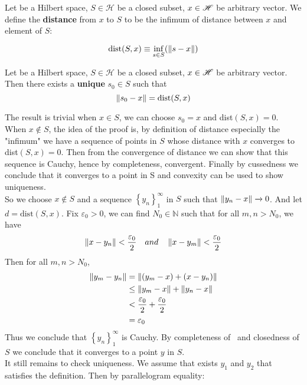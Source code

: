 \begin{definition}\rm\nextline
	Let \hbs be a Hilbert space, $S\in \mathscr{H}$ be a closed subset, $x\in \mathscr{H}$ be arbitrary vector. We define the {\bf{distance}} from $x$ to $S$ to be the infimum of distance between $x$ and element of $S$:

	$$\text{dist}(S,x)\equiv\inf_{s\in S} (\left\|{s-x}\right\|)$$

\end{definition}
\begin{proposition}\rm\label{Nearest Point Property}\nextline
	Let \hbs be a Hilbert space, $S\in \mathscr{H}$ be a closed subset, $x\in \mathscr{H}$ be arbitrary vector. Then there exists a {\bf{unique}} $s_0\in S$ such that
	$$
		\left\|{s_0-x}\right\|= \text{dist}(S,x)
	$$
	\begin{pf}{}{}
	The result is trivial when $x\in S$, we can choose $s_0=x$ and dist$(S,x)=0$.\\
	When $x\notin S$, the idea of the proof is, by definition of distance especially the "infimum" we have a sequence of points in $S$ whose distance with $x$ converges to dist$(S,x)=0$. Then from the convergence of distance we can show that this sequence is Cauchy, hence by completeness, convergent. Finally by cussedness we conclude that it converges to a point in S and convexity can be used to show uniqueness. \\
	So we choose $x\notin S$ and a sequence $\left\{y_n\right\}_1^\infty$ in $S$ such that $\left\|{y_n-x}\right\|\xrightarrow{}0$. And let $d=\text{dist}(S,x)$.
	Fix $\varepsilon_0>0$, we can find $N_0\in\mathbb{N}$ such that for all $m,n>N_0$, we have $$\left\|{x-y_n}\right\|<\frac{\varepsilon_0}{2}\quad and\quad \left\|{x-y_m}\right\|<\frac{\varepsilon_0}{2}
	$$
	Then for all $m,n>N_0$,
	\begin{equation}
		\begin{split}
			\left\|{y_m-y_n}\right\|&=\left\|{(y_m-x)+(x-y_n)}\right\|\\
			&\leq\left\|{y_m-x}\right\|+\left\|{y_n-x}\right\|\\
			&<\frac{\varepsilon_0}{2}+\frac{\varepsilon_0}{2}\\
			&=\varepsilon_0
		\end{split}
	\end{equation}
	Thus we conclude that $\left\{y_n\right\}_1^\infty$ is Cauchy. By completeness of \hbs  \, and closedness of $S$ we conclude that it converges to a point $y$ in $S$.\\
	It still remains to check uniqueness. We assume that exists $y_1$ and $y_2$ that satisfies the definition. Then by parallelogram equality:

\end{pf}
\end{proposition}
